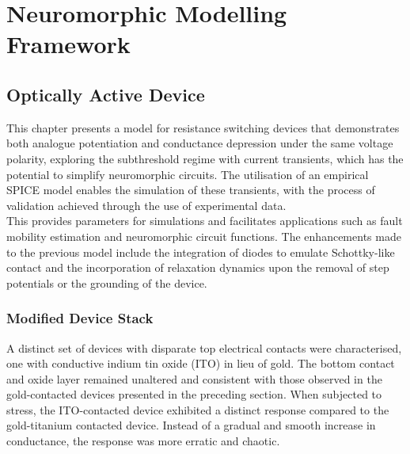 \chapter{Neuromorphic Modelling Framework}

\section[Optically Active Device]{Optically Active Device}

This chapter presents a model for resistance switching devices that demonstrates both analogue potentiation and conductance depression under the same voltage polarity, exploring the subthreshold regime with current transients, which has the potential to simplify neuromorphic circuits. The utilisation of an empirical SPICE model enables the simulation of these transients, with the process of validation achieved through the use of experimental data. \\

\noindent This provides parameters for simulations and facilitates applications such as fault mobility estimation and neuromorphic circuit functions. The enhancements made to the previous model include the integration of diodes to emulate Schottky-like contact and the incorporation of relaxation dynamics upon the removal of step potentials or the grounding of the device.

\subsection[Modified Device Stack]{Modified Device Stack}

A distinct set of devices with disparate top electrical contacts were characterised, one with conductive indium tin oxide (ITO) in lieu of gold. The bottom contact and oxide layer remained unaltered and consistent with those observed in the gold-contacted devices presented in the preceding section. When subjected to stress, the ITO-contacted device exhibited a distinct response compared to the gold-titanium contacted device. Instead of a gradual and smooth increase in conductance, the response was more erratic and chaotic. \\

